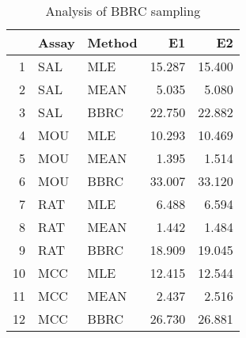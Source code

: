 \begin{table}[t]
\begin{center}
\begin{tabular}{rllrr}
  \hline
 & Assay & Method & E1 & E2 \\ 
  \hline
1 & SAL & MLE & 15.287 & 15.400 \\ 
  2 & SAL & MEAN & 5.035 & 5.080 \\ 
  3 & SAL & BBRC & 22.750 & 22.882 \\ 
  4 & MOU & MLE & 10.293 & 10.469 \\ 
  5 & MOU & MEAN & 1.395 & 1.514 \\ 
  6 & MOU & BBRC & 33.007 & 33.120 \\ 
  7 & RAT & MLE & 6.488 & 6.594 \\ 
  8 & RAT & MEAN & 1.442 & 1.484 \\ 
  9 & RAT & BBRC & 18.909 & 19.045 \\ 
  10 & MCC & MLE & 12.415 & 12.544 \\ 
  11 & MCC & MEAN & 2.437 & 2.516 \\ 
  12 & MCC & BBRC & 26.730 & 26.881 \\ 
   \hline
\end{tabular}
\caption{Analysis of BBRC sampling}
\label{t:anal}
\end{center}
\end{table}
